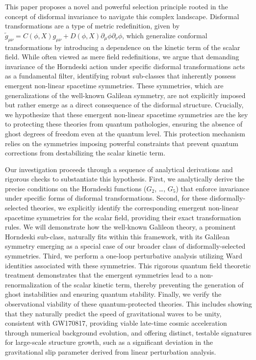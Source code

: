 \documentclass[twocolumn]{aastex631}
\begin{document}
This paper proposes a novel and powerful selection principle rooted in the concept of disformal invariance to navigate this complex landscape. Disformal transformations are a type of metric redefinition, given by $\tilde{g}_{\mu\nu} = C(\phi, X) g_{\mu\nu} + D(\phi, X) \partial_\mu \phi \partial_\nu \phi$, which generalize conformal transformations by introducing a dependence on the kinetic term of the scalar field. While often viewed as mere field redefinitions, we argue that demanding invariance of the Horndeski action under specific disformal transformations acts as a fundamental filter, identifying robust sub-classes that inherently possess emergent non-linear spacetime symmetries. These symmetries, which are generalizations of the well-known Galilean symmetry, are not explicitly imposed but rather emerge as a direct consequence of the disformal structure. Crucially, we hypothesize that these emergent non-linear spacetime symmetries are the key to protecting these theories from quantum pathologies, ensuring the absence of ghost degrees of freedom even at the quantum level. This protection mechanism relies on the symmetries imposing powerful constraints that prevent quantum corrections from destabilizing the scalar kinetic term.

Our investigation proceeds through a sequence of analytical derivations and rigorous checks to substantiate this hypothesis. First, we analytically derive the precise conditions on the Horndeski functions ($G_2$, \dots, $G_5$) that enforce invariance under specific forms of disformal transformations. Second, for these disformally-selected theories, we explicitly identify the corresponding emergent non-linear spacetime symmetries for the scalar field, providing their exact transformation rules. We will demonstrate how the well-known Galileon theory, a prominent Horndeski sub-class, naturally fits within this framework, with its Galilean symmetry emerging as a special case of our broader class of disformally-selected symmetries. Third, we perform a one-loop perturbative analysis utilizing Ward identities associated with these symmetries. This rigorous quantum field theoretic treatment demonstrates that the emergent symmetries lead to a non-renormalization of the scalar kinetic term, thereby preventing the generation of ghost instabilities and ensuring quantum stability. Finally, we verify the observational viability of these quantum-protected theories. This includes showing that they naturally predict the speed of gravitational waves to be unity, consistent with GW170817, providing viable late-time cosmic acceleration through numerical background evolution, and offering distinct, testable signatures for large-scale structure growth, such as a significant deviation in the gravitational slip parameter derived from linear perturbation analysis.
\end{document}
